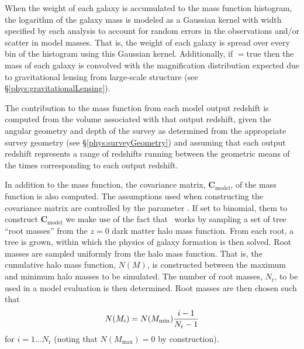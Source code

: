 When the weight of each galaxy is accumulated to the mass function histogram, the logarithm of the galaxy mass is modeled as a Gaussian kernel with width specified by each analysis to account for random errors in the observations and/or scatter in model masses. That is, the weight of each galaxy is spread over every bin of the histogram using this Gaussian kernel. Additionally, if {\normalfont \ttfamily [analysisMassFunctionsApplyGravitationalLensing]}$=${\normalfont \ttfamily true} then the mass of each galaxy is convolved with the magnification distribution expected due to gravitational lensing from large-scale structure (see \S\ref{phys:gravitationalLensing}).

The contribution to the mass function from each model output redshift is computed from the volume associated with that output redshift, given the angular geometry and depth of the survey as determined from the appropriate survey geometry (see \S\ref{phys:surveyGeometry}) and assuming that each output redshift represents a range of redshifts running between the geometric means of the times corresponding to each output redshift. 

In addition to the mass function, the covariance matrix, $\mathbf{C}_\mathrm{model}$, of the mass function is also computed. The assumptions used when constructing the covariance matrix are controlled by the parameter {\normalfont \ttfamily [analysisMassFunctionCovarianceModel]}. If set to {\normalfont \ttfamily binomial}, them to construct $\mathbf{C}_\mathrm{model}$ we make use of the fact that \glc\ works by sampling a set of tree ``root masses'' from the $z=0$ dark matter halo mass function. From each root, a tree is grown, within which the physics of galaxy formation is then solved. Root masses are sampled uniformly from the halo mass function. That is, the cumulative halo mass function, $N(M)$, is constructed between the maximum and minimum halo masses to be simulated. The number of root masses, $N_\mathrm{r}$, to be used in a model evaluation is then determined. Root masses are then chosen such that
\begin{equation}
 N(M_i) = N(M_\mathrm{min}) {i-1 \over N_\mathrm{r}-1}
\end{equation}
for $i=1\ldots N_\mathrm{r}$ (noting that $N(M_\mathrm{max})=0$ by construction). 


